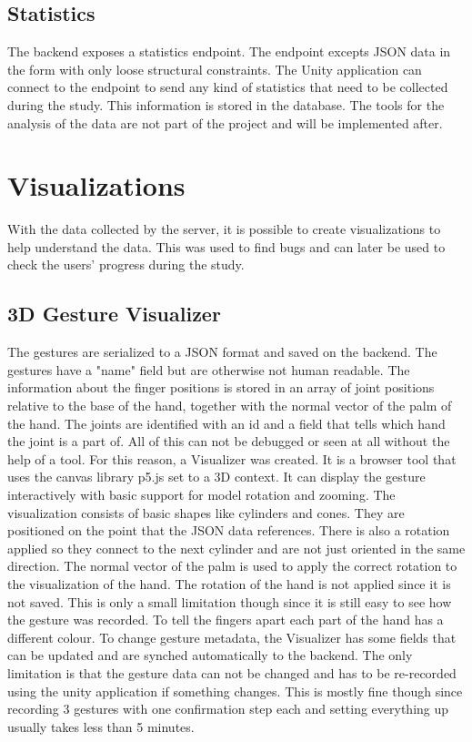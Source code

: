 \subsection{Statistics}
The backend exposes a statistics endpoint. The endpoint excepts JSON data in the form with only loose structural constraints. The Unity application can connect to the endpoint to send any kind of statistics that need to be collected during the study. This information is stored in the database. The tools for the analysis of the data are not part of the project and will be implemented after.  


\section{Visualizations}
With the data collected by the server, it is possible to create visualizations to help understand the data. This was used to find bugs and can later be used to check the users' progress during the study.

\subsection{3D Gesture Visualizer}
The gestures are serialized to a JSON format and saved on the backend. The gestures have a "name" field but are otherwise not human readable. The information about the finger positions is stored in an array of joint positions relative to the base of the hand, together with the normal vector of the palm of the hand. The joints are identified with an id and a field that tells which hand the joint is a part of. All of this can not be debugged or seen at all without the help of a tool. For this reason, a Visualizer was created. It is a browser tool that uses the canvas library p5.js set to a 3D context. It can display the gesture interactively with basic support for model rotation and zooming. The visualization consists of basic shapes like cylinders and cones. They are positioned on the point that the JSON data references. There is also a rotation applied so they connect to the next cylinder and are not just oriented in the same direction. The normal vector of the palm is used to apply the correct rotation to the visualization of the hand. The rotation of the hand is not applied since it is not saved. This is only a small limitation though since it is still easy to see how the gesture was recorded. To tell the fingers apart each part of the hand has a different colour. To change gesture metadata, the Visualizer has some fields that can be updated and are synched automatically to the backend. The only limitation is that the gesture data can not be changed and has to be re-recorded using the unity application if something changes. This is mostly fine though since recording 3 gestures with one confirmation step each and setting everything up usually takes less than 5 minutes.


